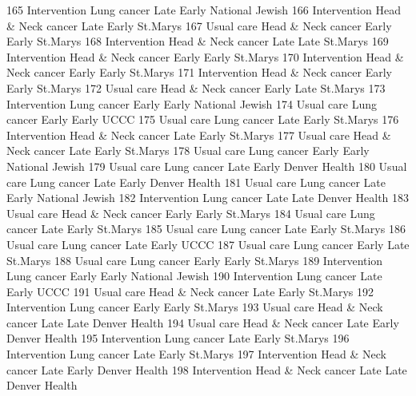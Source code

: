 \documentclass[
  letterpaper,
  DIV=11,
  numbers=noendperiod]{scrreprt}
\newenvironment{Shaded}{\begin{snugshade}}{\end{snugshade}}
\newcommand{\NormalTok}[1]{\textcolor[rgb]{0.00,0.23,0.31}{#1}}
\begin{document}
\begin{Shaded}
\begin{Highlighting}[]
\NormalTok{165 Intervention        Lung cancer    Late Early National Jewish}
\NormalTok{166 Intervention Head \& Neck cancer    Late Early        St.Marys}
\NormalTok{167   Usual care Head \& Neck cancer   Early Early        St.Marys}
\NormalTok{168 Intervention Head \& Neck cancer    Late  Late        St.Marys}
\NormalTok{169 Intervention Head \& Neck cancer   Early Early        St.Marys}
\NormalTok{170 Intervention Head \& Neck cancer   Early Early        St.Marys}
\NormalTok{171 Intervention Head \& Neck cancer   Early Early        St.Marys}
\NormalTok{172   Usual care Head \& Neck cancer   Early  Late        St.Marys}
\NormalTok{173 Intervention        Lung cancer   Early Early National Jewish}
\NormalTok{174   Usual care        Lung cancer   Early Early            UCCC}
\NormalTok{175   Usual care        Lung cancer    Late Early        St.Marys}
\NormalTok{176 Intervention Head \& Neck cancer    Late Early        St.Marys}
\NormalTok{177   Usual care Head \& Neck cancer    Late Early        St.Marys}
\NormalTok{178   Usual care        Lung cancer   Early Early National Jewish}
\NormalTok{179   Usual care        Lung cancer    Late Early   Denver Health}
\NormalTok{180   Usual care        Lung cancer    Late Early   Denver Health}
\NormalTok{181   Usual care        Lung cancer    Late Early National Jewish}
\NormalTok{182 Intervention        Lung cancer    Late  Late   Denver Health}
\NormalTok{183   Usual care Head \& Neck cancer   Early Early        St.Marys}
\NormalTok{184   Usual care        Lung cancer    Late Early        St.Marys}
\NormalTok{185   Usual care        Lung cancer    Late Early        St.Marys}
\NormalTok{186   Usual care        Lung cancer    Late Early            UCCC}
\NormalTok{187   Usual care        Lung cancer   Early  Late        St.Marys}
\NormalTok{188   Usual care        Lung cancer   Early Early        St.Marys}
\NormalTok{189 Intervention        Lung cancer   Early Early National Jewish}
\NormalTok{190 Intervention        Lung cancer    Late Early            UCCC}
\NormalTok{191   Usual care Head \& Neck cancer    Late Early        St.Marys}
\NormalTok{192 Intervention        Lung cancer   Early Early        St.Marys}
\NormalTok{193   Usual care Head \& Neck cancer    Late  Late   Denver Health}
\NormalTok{194   Usual care Head \& Neck cancer    Late Early   Denver Health}
\NormalTok{195 Intervention        Lung cancer    Late Early        St.Marys}
\NormalTok{196 Intervention        Lung cancer    Late Early        St.Marys}
\NormalTok{197 Intervention Head \& Neck cancer    Late Early   Denver Health}
\NormalTok{198 Intervention Head \& Neck cancer    Late  Late   Denver Health}

\end{Highlighting}
\end{Shaded}
\end{document}
